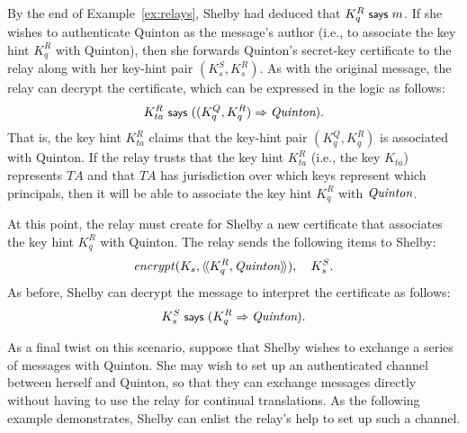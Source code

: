 \begin{example}\label{ex:relays-auth}
  By the end of Example~\ref{ex:relays}, Shelby had deduced that $K_q^R
  \says m$.  If she wishes to authenticate Quinton as the message's author
  (i.e., to associate the key hint $K_q^R$ with Quinton), then she
  forwards Quinton's secret-key certificate to the relay along with her
  key-hint pair $(K_s^S,K_s^R)$.  As with the original message, the
  relay can decrypt the certificate, 
  which can be expressed in the logic as follows:
  \[ K_{ta}^R \says ((K_q^Q, K_q^R) \speaksfor \name{Quinton}). \]
  That is, the key hint $K_{ta}^R$ claims that the key-hint pair
  $(K_q^Q, K_q^R)$ is associated with Quinton.  If the relay trusts that
  the key hint $K_{ta}^R$ (i.e., the key $K_{ta}$) represents $TA$ and
  that $TA$ has jurisdiction over which keys represent which principals,
  then it will be able to associate the key hint $K_q^R$ with
  $\name{Quinton}$.

  At this point, the relay must create for Shelby a new certificate that
  associates the key hint $K_q^R$ with Quinton.  The relay sends the
  following items to Shelby:
  \[ \encrypt{\cat{K_q^R,\name{Quinton}}}{K_s}, \quad K_s^S. \] 
  As before, Shelby can decrypt the message to interpret the certificate
  as follows:
  \[ K_s^S \says (K_q^R \speaksfor \name{Quinton}). \]
\end{example}

As a final twist on this scenario, suppose that Shelby wishes to
exchange a series of messages with Quinton.  She may wish to set up
an authenticated channel between herself and Quinton, so that they can
exchange messages directly without having to use the relay for continual
translations.   As the following example demonstrates, Shelby can enlist
the relay's help to set up such a channel. 

